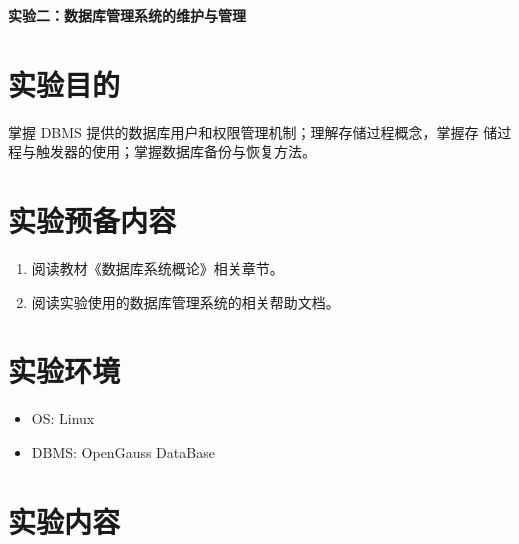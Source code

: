 \begin{center}
\textbf{实验二：数据库管理系统的维护与管理}
\end{center}

\section{实验目的}
掌握 DBMS 提供的数据库用户和权限管理机制；理解存储过程概念，掌握存
储过程与触发器的使用；掌握数据库备份与恢复方法。

\section{实验预备内容}
\begin{enumerate}
  \item 阅读教材《数据库系统概论》相关章节。
  \item 阅读实验使用的数据库管理系统的相关帮助文档。
\end{enumerate}

\section{实验环境}
\begin{itemize}
  \item OS: Linux
  \item DBMS: OpenGauss DataBase
\end{itemize}

\section{实验内容}

